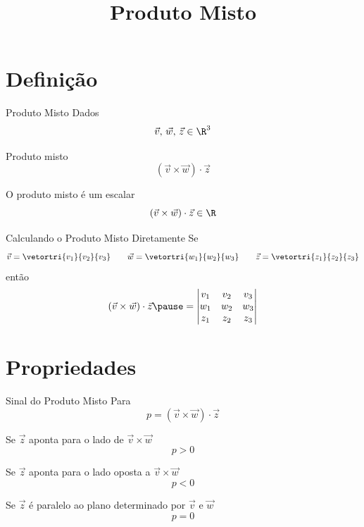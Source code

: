 \documentclass[fleqn,aspectratio=169,12pt]{beamer}
\title{Produto Misto}
\begin{document}
\addtitle

\section{Definição}

\begin{frame}{Produto Misto}
  Dados
  \[
    \vec{v}, \, \vec{w}, \, \vec{z}\in\R^3
  \]

  \pause
  Produto misto
  \[
    \left(\vec{v}\times\vec{w}\right)\cdot\vec{z}
  \]

  \pause
  O produto misto é um escalar
  \[
  \left(\vec{v}\times\vec{w}\right)\cdot\vec{z} \in \R
  \]
\end{frame}



\begin{frame}{Calculando o Produto Misto Diretamente}
  Se
  \[
    \vec{v} = \vetortri{v_1}{v_2}{v_3}
    \qquad
    \vec{w} = \vetortri{w_1}{w_2}{w_3}
    \qquad
    \vec{z} = \vetortri{z_1}{z_2}{z_3}
  \]
  \pause
  então
  \[
    \left(\vec{v}\times\vec{w}\right)\cdot\vec{z}
    \pause
    = \begin{vmatrix}
      v_1 & v_2 & v_3 \\
      w_1 & w_2 & w_3 \\
      z_1 & z_2 & z_3
    \end{vmatrix}
  \]
\end{frame}



\section{Propriedades}

\begin{frame}{Sinal do Produto Misto}
  Para
  \[
    p = \left(\vec{v}\times\vec{w}\right)\cdot\vec{z}
  \]

  \pause
  Se $\vec{z}$ aponta para o lado de $\vec{v}\times\vec{w}$
  \[
    p > 0
  \]

  \pause
  Se $\vec{z}$ aponta para o lado oposta a $\vec{v}\times\vec{w}$
  \[
    p < 0
  \]

  \pause
  Se $\vec{z}$ é paralelo ao plano determinado por $\vec{v}$ e $\vec{w}$
  \[
    p = 0
  \]
\end{frame}
\end{document}
